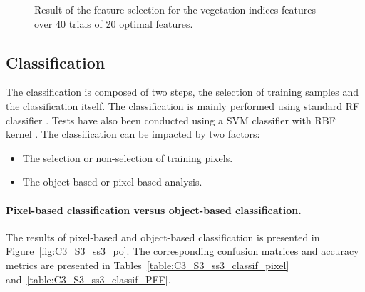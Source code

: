 \begin{figure} [htbp]%
\begin{center}
\end{center}
\caption{Result of the feature selection for the vegetation indices features over 40 trials of 20 optimal features.}
\label{fig:sel_indices}
\end{figure}


\subsection{Classification}
The classification is composed of two steps, the selection of training samples and the classification itself.
The classification is mainly performed using standard RF classifier \citep{opencv}. Tests have also been conducted using a SVM classifier with RBF kernel \citep{vapnik2013nature}. The classification can be impacted by two factors:
\begin{itemize}
\item The selection or non-selection of training pixels.
\item The object-based or pixel-based analysis.
\end{itemize}

\paragraph{Pixel-based classification versus object-based classification. \\}
The results of pixel-based and object-based classification is presented in Figure~\ref{fig:C3_S3_ss3_po}. The corresponding confusion matrices and accuracy metrics are presented in Tables~\ref{table:C3_S3_ss3_classif_pixel} and~\ref{table:C3_S3_ss3_classif_PFF}.

